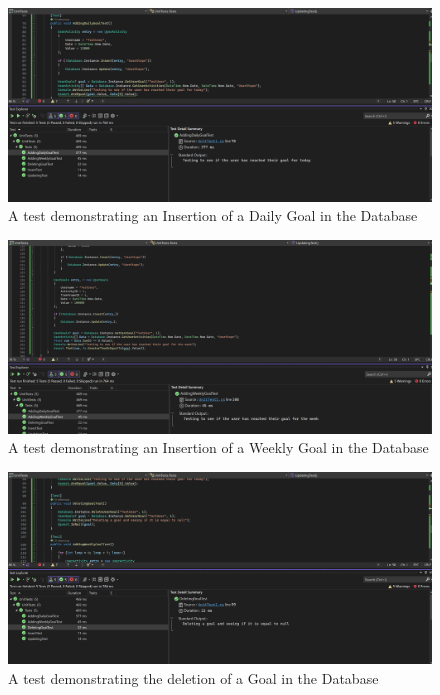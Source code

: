 \documentclass[11pt]{article}
\begin{document}
\begin{figure}[!ht]
\centering
    \includegraphics[width=\linewidth]{AddingDailyGoalTest.png}
\caption{A test demonstrating an Insertion of a Daily Goal in the Database}
\label{fig:Database Unit Test 3}
\end{figure}

\begin{figure}[!ht]
\centering
    \includegraphics[width=\linewidth]{AddingWeeklyGoalTest.png}
\caption{A test demonstrating an Insertion of a Weekly Goal in the Database}
\label{fig:Database Unit Test 4}
\end{figure}
\begin{figure}[!ht]
\centering
    \includegraphics[width=\linewidth]{DeletingGoalTest.png}
\caption{A test demonstrating the deletion of a Goal in the Database}
\label{fig:Database Unit Test 5}
\end{figure}
\end{document}
